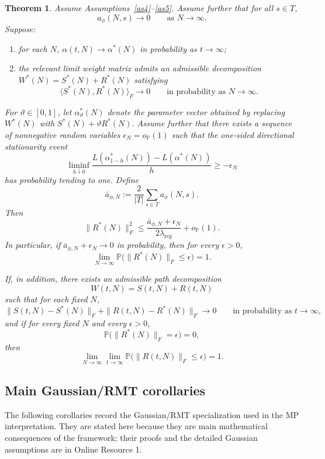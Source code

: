 \documentclass[11pt]{article}
\theoremstyle{plain}
\newtheorem{thm}{Theorem}[section]
\theoremstyle{definition}
\theoremstyle{remark}
\newcommand{\PP}{\mathbb{P}}
\newcommand{\1}{\mathbf{1}}
\begin{document}
\begin{thm}
\label{main_result_reducing_noise_general}
Assume Assumptions~\ref{as4}--\ref{as5}. Assume further that for all \(s\in T\),
\[
a_\phi(N,s)\to0
\qquad\text{as }N\to\infty.
\]
Suppose:
\begin{enumerate}[leftmargin=2em]
\item for each \(N\), \(\alpha(t,N)\to \alpha^*(N)\) in probability as \(t\to\infty\);
\item the relevant limit weight matrix admits an admissible decomposition \(W^*(N)=S^*(N)+R^*(N)\) satisfying
\[
\langle S^*(N),R^*(N)\rangle_F\to0
\qquad\text{in probability as }N\to\infty.
\]
\end{enumerate}
\noindent For \(\vartheta\in[0,1]\), let \(\alpha_\vartheta^*(N)\) denote the parameter vector obtained by replacing \(W^*(N)\) with \(S^*(N)+\vartheta R^*(N)\). Assume further that there exists a sequence of nonnegative random variables \(\epsilon_N=o_{\PP}(1)\) such that the one-sided directional stationarity event
\[
\liminf_{h\downarrow0}
\frac{
L(\alpha_{1-h}^*(N))-L(\alpha^*(N))
}{h}
\ge -\epsilon_N
\]
has probability tending to one.
Define
\[
\bar a_{\phi,N}:=\frac{2}{|T|}\sum_{s\in T}a_\phi(N,s).
\]
Then
\[
\|R^*(N)\|_F^2
\le
\frac{\bar a_{\phi,N}+\epsilon_N}{2\lambda_{\mathrm{reg}}}
+o_{\PP}(1).
\]
In particular, if \(\bar a_{\phi,N}+\epsilon_N\to0\) in probability, then for every \(\epsilon>0\),
\[
\lim_{N\to\infty}\PP\big(\|R^*(N)\|_F\le \epsilon\big)=1.
\]

If, in addition, there exists an admissible path decomposition
\[
W(t,N)=S(t,N)+R(t,N)
\]
such that for each fixed \(N\),
\[
\|S(t,N)-S^*(N)\|_F+\|R(t,N)-R^*(N)\|_F\to0
\qquad\text{in probability as }t\to\infty,
\]
and if for every fixed \(N\) and every \(\epsilon>0\),
\[
\PP\big(\|R^*(N)\|_F=\epsilon\big)=0,
\]
then
\[
\lim_{N\to\infty}\lim_{t\to\infty}\PP\big(\|R(t,N)\|_F\le \epsilon\big)=1.
\]
\end{thm}


\subsection{Main Gaussian/RMT corollaries}
\label{subsec:main_gaussian_rmt_corollaries}

The following corollaries record the Gaussian/RMT specialization used in the MP interpretation. They are stated here because they are main mathematical consequences of the framework; their proofs and the detailed Gaussian assumptions are in Online Resource 1.
\end{document}
